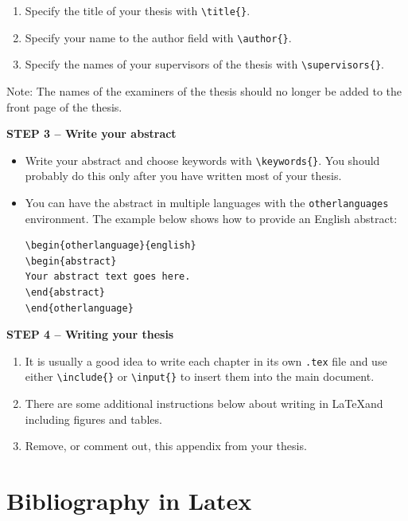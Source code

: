 \begin{enumerate}
\item Specify the title of your thesis with \texttt{\textbackslash title\{\}}.
\item Specify your name to the author field with \texttt{\textbackslash author\{\}}.
\item Specify the names of your supervisors of the thesis with \texttt{\textbackslash supervisors\{\}}.
\end{enumerate}
Note: The names of the examiners of the thesis should no longer be added to the front page of the thesis. 

{\textbf{STEP 3 -- Write your abstract}}

\begin{itemize}
\item Write your abstract and choose keywords with \texttt{\textbackslash keywords\{\}}. You should probably do this only after you have written most of your thesis.
\item You can have the abstract in multiple languages with the \texttt{otherlanguages} environment. The example below shows how to provide an English abstract: 

\begin{verbatim}
\begin{otherlanguage}{english} 
\begin{abstract}
Your abstract text goes here. 
\end{abstract} 
\end{otherlanguage}
\end{verbatim}

\end{itemize}

{\textbf{STEP 4 -- Writing your thesis}}

\begin{enumerate}
\item It is usually a good idea to write each chapter in its own \texttt{.tex} file and use either \texttt{\textbackslash include\{\}} or \texttt{\textbackslash input\{\}} to insert them into the main document.
\item There are some additional instructions below about writing in \LaTeX and including figures and tables.
\item Remove, or comment out, this appendix from your thesis.
\end{enumerate}



\section{Bibliography in Latex}\label{app:bibliography}

